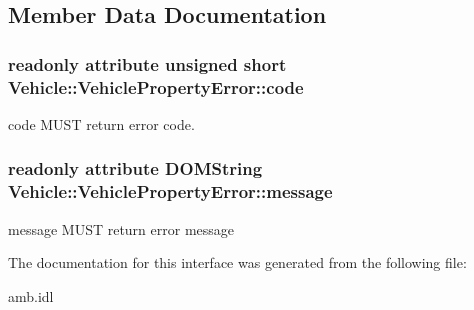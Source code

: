 \subsection{Member Data Documentation}
\hypertarget{interfaceVehicle_1_1VehiclePropertyError_a9fe467c714951d08485d5aadc8fc7482}{
\subsubsection[{code}]{\setlength{\rightskip}{0pt plus 5cm}readonly attribute unsigned short Vehicle\-::\-Vehicle\-Property\-Error\-::code}}\label{interfaceVehicle_1_1VehiclePropertyError_a9fe467c714951d08485d5aadc8fc7482}
code M\-U\-S\-T return error code. \hypertarget{interfaceVehicle_1_1VehiclePropertyError_a4d61bb9cbb51d5519508198fa7f9f122}{
\subsubsection[{message}]{\setlength{\rightskip}{0pt plus 5cm}readonly attribute D\-O\-M\-String Vehicle\-::\-Vehicle\-Property\-Error\-::message}}\label{interfaceVehicle_1_1VehiclePropertyError_a4d61bb9cbb51d5519508198fa7f9f122}
message M\-U\-S\-T return error message 

The documentation for this interface was generated from the following file\-:\begin{DoxyCompactItemize}
\item 
amb.\-idl\end{DoxyCompactItemize}
